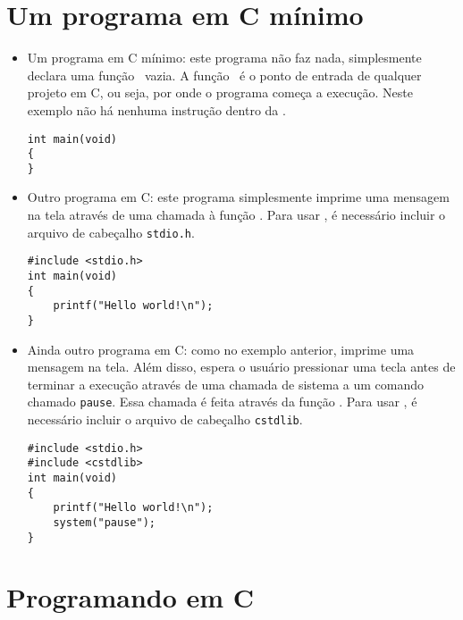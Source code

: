
\section{Um programa em C mínimo}


\begin{itemize}

\item Um programa em C mínimo: este programa não faz nada, simplesmente declara uma função \MAIN\ vazia. A função \MAIN\ é o ponto de entrada de qualquer projeto em C, ou seja, por onde o programa começa a execução. Neste exemplo não há nenhuma instrução dentro da \MAIN.

\begin{lstlisting}
int main(void)
{
}
\end{lstlisting}


\item Outro programa em C: este programa simplesmente imprime uma mensagem na tela através de uma chamada à função \PRINTF. Para usar \PRINTF, é necessário incluir o arquivo de cabeçalho {\tt stdio.h}.

\begin{lstlisting}
#include <stdio.h>
int main(void)
{
    printf("Hello world!\n");
}
\end{lstlisting}


\item Ainda outro programa em C: como no exemplo anterior, imprime uma mensagem na tela. Além disso, espera o usuário pressionar uma tecla antes de terminar a execução através de uma chamada de sistema a um comando chamado {\tt pause}. Essa chamada é feita através da função \SYSTEM. Para usar \SYSTEM, é necessário incluir o arquivo de cabeçalho {\tt cstdlib}.

\begin{lstlisting}
#include <stdio.h>
#include <cstdlib>
int main(void)
{
    printf("Hello world!\n");
    system("pause");
}
\end{lstlisting}

\end{itemize}




\section{Programando em C}

